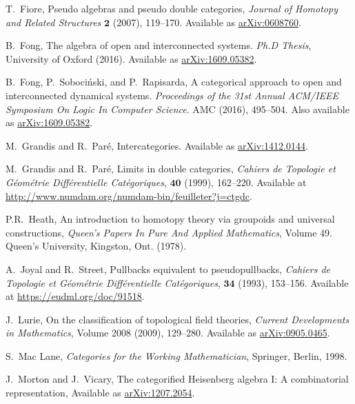 \documentclass[11pt]{amsart}
\theoremstyle{remark}
\theoremstyle{definition}
\begin{document}
\begin{thebibliography}{100}
T.~Fiore, 
Pseudo algebras and pseudo double categories, 
\emph{Journal of Homotopy and Related Structures} $\mathbf{2}$ 
(2007), 119--170. 
Available as \href{http://arxiv.org/abs/math/0608760}{arXiv:0608760}.

B.~Fong,
The algebra of open and interconnected systems.
\emph{Ph.D Thesis},
University of Oxford (2016).
Available as \href{https://arxiv.org/abs/1609.05382}{arXiv:1609.05382}.

B.~Fong, P.~Soboci\'{n}ski, and P.~Rapisarda,
A categorical approach to open and interconnected dynamical systems.
\emph{Proceedings of the 31st Annual ACM/IEEE Symposium On Logic In Computer Science}.
AMC (2016), 495--504.
Also available as \href{https://arxiv.org/abs/1609.05382}{arXiv:1609.05382}.

M.~Grandis and R.~Par\'{e}, 
Intercategories.
Available as \href{https://arxiv.org/abs/1412.0144}{arXiv:1412.0144}.

M.~Grandis and R.~Par\'{e}, 
Limits in double categories, 
\emph{Cahiers de Topologie et G\'{e}om\'{e}trie Diff\'{e}rentielle Cat\'{e}goriques}, $\mathbf{40}$  
(1999), 162--220. 
Available at \href{http://www.numdam.org/numdam-bin/feuilleter?j=ctgdc}{http://www.numdam.org/numdam-bin/feuilleter?j=ctgdc}.

P.R.\ Heath,
An introduction to homotopy theory via groupoids and universal constructions,
\emph{Queen’s Papers In Pure And Applied Mathematics}, Volume 49.
Queen’s University,  Kingston, Ont. (1978).

A.\ Joyal and R.\ Street,
Pullbacks equivalent to pseudopullbacks,
\emph{Cahiers de Topologie et G\'{e}om\'{e}trie Diff\'{e}rentielle Cat\'{e}goriques}, $\mathbf{34}$
(1993), 153--156.
Available at \href{https://eudml.org/doc/91518}{https://eudml.org/doc/91518}.

J.~Lurie,
On the classification of topological field theories,
\emph{Current Developments in Mathematics},
Volume 2008 (2009), 129--280.
Available as \href{https://arxiv.org/abs/0905.0465}{arXiv:0905.0465}.

S.~Mac Lane, 
\emph{Categories for the Working Mathematician},
Springer, Berlin, 1998.

J.\ Morton and J.\ Vicary,
The categorified Heisenberg algebra I: A combinatorial representation,
Available as \href{https://arxiv.org/abs/1207.2054}{arXiv:1207.2054}.


\end{thebibliography}
\end{document}
